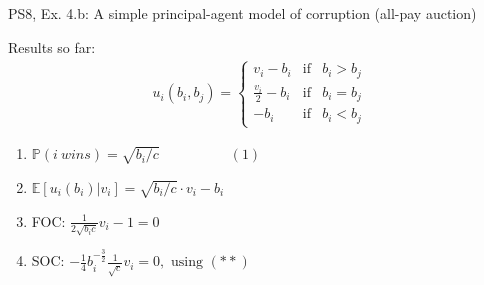 \begin{frame}{PS8, Ex. 4.b: A simple principal-agent model of corruption (all-pay auction)}
\begin{multicols}{2}
      Results so far: \vspace{-6pt}
      \begin{align*}
        u_i(b_i,b_j)=\left\{\begin{array}{lcl}
          v_i-b_i           & \text{if} & b_i>b_j \\
          \frac{v_i}{2}-b_i & \text{if} & b_i=b_j \\
          -b_i              & \text{if} & b_i<b_j
        \end{array}\right.
      \end{align*} \vspace{-16pt}
      \begin{enumerate}
        \item $\mathbb{P}(i\ wins)=\sqrt{b_i/c}\quad\quad\quad\quad\quad(1)$
        \item $\mathbb{E}[u_i(b_i)|v_i]=\sqrt{b_i/c}\cdot v_i-b_i$
        \item FOC: $\frac{1}{2\sqrt{b_ic}}v_i-1=0$
        \item[] SOC: $-\frac{1}{4}b_i^{-\frac{3}{2}}\frac{1}{\sqrt{c}}v_i=0,\text{ using }(**)$
      \end{enumerate}
      \vfill\null
    \end{multicols}
\end{frame}
